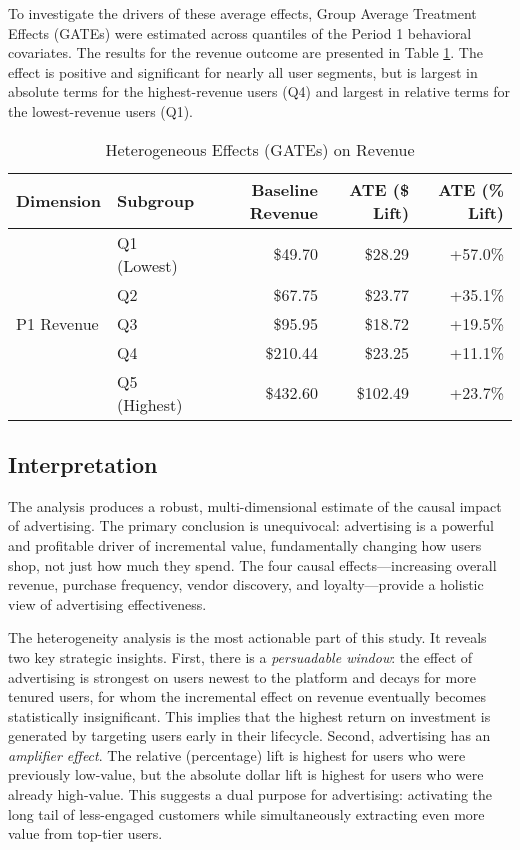 To investigate the drivers of these average effects, Group Average Treatment Effects (GATEs) were estimated across quantiles of the Period 1 behavioral covariates. The results for the revenue outcome are presented in Table \ref{tab:gate_revenue}. The effect is positive and significant for nearly all user segments, but is largest in absolute terms for the highest-revenue users (Q4) and largest in relative terms for the lowest-revenue users (Q1).

\begin{table}[htbp!]
\centering
\caption{Heterogeneous Effects (GATEs) on Revenue}
\label{tab:gate_revenue}
\begin{tabular}{llrrr}
\toprule
Dimension & Subgroup & Baseline Revenue & ATE (\$ Lift) & ATE (\% Lift) \\
\midrule
\multirow{5}{*}{P1 Revenue} & Q1 (Lowest) & \$49.70 & \$28.29 & +57.0\%
\\
 & Q2 & \$67.75 & \$23.77 & +35.1\%
\\
 & Q3 & \$95.95 & \$18.72 & +19.5\%
\\
 & Q4 & \$210.44 & \$23.25 & +11.1\%
\\
 & Q5 (Highest) & \$432.60 & \$102.49 & +23.7\%
\\
\bottomrule
\end{tabular}
\end{table}

\subsection*{Interpretation}

The analysis produces a robust, multi-dimensional estimate of the causal impact of advertising. The primary conclusion is unequivocal: advertising is a powerful and profitable driver of incremental value, fundamentally changing how users shop, not just how much they spend. The four causal effects—increasing overall revenue, purchase frequency, vendor discovery, and loyalty—provide a holistic view of advertising effectiveness.

The heterogeneity analysis is the most actionable part of this study. It reveals two key strategic insights. First, there is a \textit{persuadable window}: the effect of advertising is strongest on users newest to the platform and decays for more tenured users, for whom the incremental effect on revenue eventually becomes statistically insignificant. This implies that the highest return on investment is generated by targeting users early in their lifecycle. Second, advertising has an \textit{amplifier effect}. The relative (percentage) lift is highest for users who were previously low-value, but the absolute dollar lift is highest for users who were already high-value. This suggests a dual purpose for advertising: activating the long tail of less-engaged customers while simultaneously extracting even more value from top-tier users.